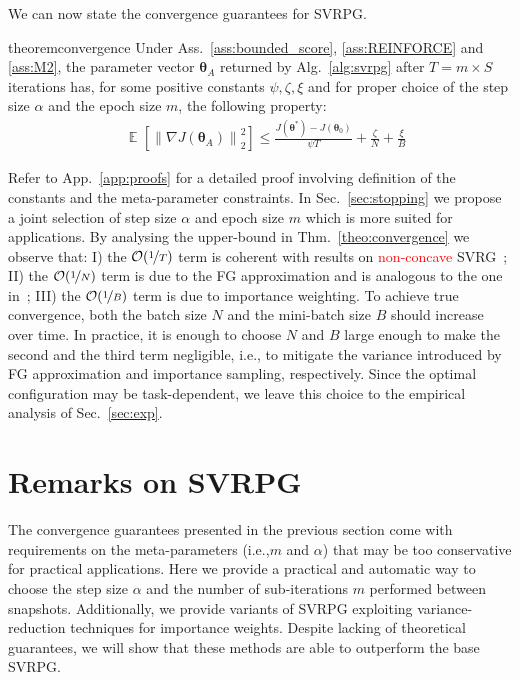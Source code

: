 \documentclass{article}
\makeatletter
\theoremstyle{remark}
\theoremstyle{definition}
\DeclareRobustCommand{\eg}{e.g.,\@\xspace}
\DeclareRobustCommand{\ie}{i.e.,\@\xspace}
\newcommand{\todopir}[1]{\todo[color=blued, inline]{\small #1}}
\DeclareMathOperator*{\EV}{\mathbb{E}}
\newcommand{\EVV}[2][\ppvect \in \ppspace]{\EV_{#1}\left[{#2}\right]}
\newcommand{\norm}[2][\infty]{\left\|#2\right\|_{#1}}
\newcommand{\vtheta}{\boldsymbol{\theta}}
\makeatother
\begin{document}
We can now state the convergence guarantees for SVRPG.
\todopir{Is it specific for REINFORCE?}
\begin{restatable}{theorem}{convergence}\label{theo:convergence}
Under Ass.~\ref{ass:bounded_score}, \ref{ass:REINFORCE} and \ref{ass:M2}, the parameter vector $\vtheta_A$ returned by Alg.~\ref{alg:svrpg} after $T=m\times S$ iterations has, for some positive constants $\psi,\zeta, \xi$ and for proper choice of the step size $\alpha$ and the epoch size $m$, the following property:
\begin{align*}
	&\EVV[]
	{\norm[2]{\nabla J(\vtheta_A)}^2} 
		\leq
		\frac{J(\vtheta^*)-J(\vtheta_0)}{\psi T} +
		\frac{\zeta}{N}
		+\frac{\xi}{B}
\end{align*}
\end{restatable}
Refer to App.~\ref{app:proofs} for a detailed proof involving definition of the constants and the meta-parameter constraints.
In Sec.~\ref{sec:stopping} we propose a joint selection of step size $\alpha$ and epoch size $m$ which is more suited for applications. 
By analysing the upper-bound in Thm.~\ref{theo:convergence} we observe that: I) the $\mathcal{O}(\nicefrac{1}{T})$ term is coherent with results on \textcolor{red}{non-concave} SVRG~\citep[\eg][]{reddi2016stochastic}; II) the $\mathcal{O}(\nicefrac{1}{N})$ term is due to the FG approximation and is analogous to the one in~\citep{harikandeh2015stopwasting}; III) the $\mathcal{O}(\nicefrac{1}{B})$ term is due to importance weighting.
To achieve true convergence, both the batch size $N$ and the mini-batch size $B$ should increase over time. 
In practice, it is enough to choose $N$ and $B$ large enough to make the second and the third term negligible, \ie to mitigate the variance introduced by FG approximation and importance sampling, respectively.
Since the optimal configuration may be task-dependent, we leave this choice to the empirical analysis of Sec.~\ref{sec:exp}. 

\section{Remarks on SVRPG}
The convergence guarantees presented in the previous section come with requirements on the meta-parameters (\ie $m$ and $\alpha$) that may be too conservative for practical applications.
Here we provide a practical and automatic way to choose the step size $\alpha$ and the number of sub-iterations $m$ performed between snapshots.
Additionally, we provide variants of SVRPG exploiting variance-reduction techniques for importance weights. Despite lacking of theoretical guarantees, we will show that these methods are able to outperform the base SVRPG.
\end{document}
